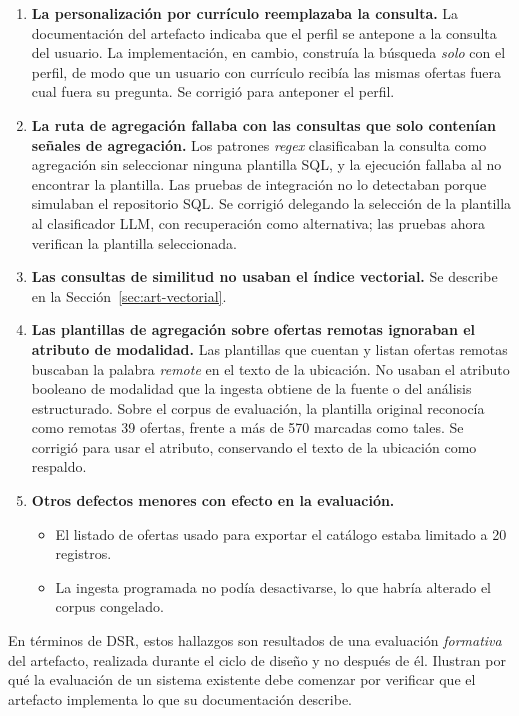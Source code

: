 \begin{enumerate}
    \item \textbf{La personalización por currículo reemplazaba la consulta.} La documentación del artefacto indicaba que el perfil se antepone a la consulta del usuario. La implementación, en cambio, construía la búsqueda \emph{solo} con el perfil, de modo que un usuario con currículo recibía las mismas ofertas fuera cual fuera su pregunta. Se corrigió para anteponer el perfil.
    \item \textbf{La ruta de agregación fallaba con las consultas que solo contenían señales de agregación.} Los patrones \textit{regex} clasificaban la consulta como agregación sin seleccionar ninguna plantilla SQL, y la ejecución fallaba al no encontrar la plantilla. Las pruebas de integración no lo detectaban porque simulaban el repositorio SQL. Se corrigió delegando la selección de la plantilla al clasificador LLM, con recuperación como alternativa; las pruebas ahora verifican la plantilla seleccionada.
    \item \textbf{Las consultas de similitud no usaban el índice vectorial.} Se describe en la Sección~\ref{sec:art-vectorial}.
    \item \textbf{Las plantillas de agregación sobre ofertas remotas ignoraban el atributo de modalidad.} Las plantillas que cuentan y listan ofertas remotas buscaban la palabra \textit{remote} en el texto de la ubicación. No usaban el atributo booleano de modalidad que la ingesta obtiene de la fuente o del análisis estructurado. Sobre el corpus de evaluación, la plantilla original reconocía como remotas 39 ofertas, frente a más de 570 marcadas como tales. Se corrigió para usar el atributo, conservando el texto de la ubicación como respaldo.
    \item \textbf{Otros defectos menores con efecto en la evaluación.}
    \begin{itemize}
        \item El listado de ofertas usado para exportar el catálogo estaba limitado a 20 registros.
        \item La ingesta programada no podía desactivarse, lo que habría alterado el corpus congelado.
    \end{itemize}
\end{enumerate}

En términos de DSR, estos hallazgos son resultados de una evaluación \emph{formativa} del artefacto, realizada durante el ciclo de diseño y no después de él. Ilustran por qué la evaluación de un sistema existente debe comenzar por verificar que el artefacto implementa lo que su documentación describe.

